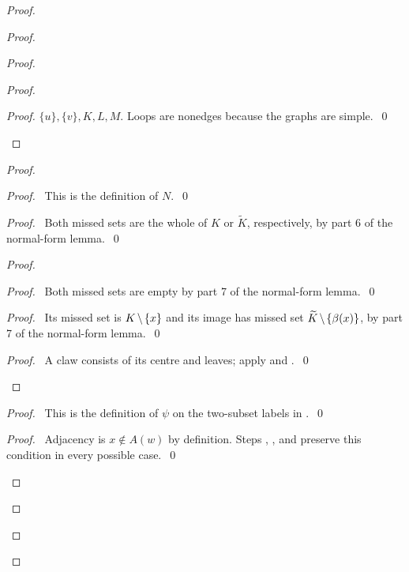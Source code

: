 \begin{proof}
\begin{proof}
\begin{proof}
\begin{proof}
\begin{proof}
     $\{u\},\{v\},K,L,M$. Loops are nonedges because the graphs are simple.~\qed\end{proof}
   \end{proof}
   \begin{proof}
    \begin{proof}\pf\ This is the definition of $N$.~\qed\end{proof}
    \begin{proof}\pf\ Both missed sets are the whole of $K$ or $\widetilde K$,
     respectively, by part 6 of the normal-form lemma.~\qed\end{proof}
    \begin{proof}
     \begin{proof}\pf\ Both missed sets are empty by part 7 of the normal-form lemma.~\qed\end{proof}
     \begin{proof}\pf\ Its missed set is $K\mathbin{\mkern-1.5mu\setminus\mkern-1.5mu}\{x\}$ and its image has missed set
      $\widetilde K\mathbin{\mkern-1.5mu\setminus\mkern-1.5mu}\{\beta(x)\}$, by part 7 of the normal-form lemma.~\qed\end{proof}
     \qedstep
     \begin{proof}\pf\ A claw consists of its centre and leaves; apply
       and .~\qed\end{proof}
    \end{proof}
    \begin{proof}\pf\ This is the definition of $\psi$ on the two-subset labels
     in .~\qed\end{proof}
    \begin{proof}\pf\ Adjacency is $x\notin A(w)$ by definition.
     Steps , , and 
     preserve this condition in every possible case.~\qed\end{proof}

\end{proof}
\end{proof}
\end{proof}
\end{proof}
